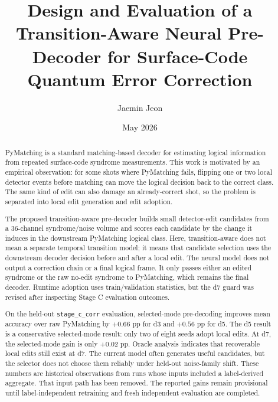 \documentclass[aps,prd,12pt,twocolumn,superscriptaddress,floatfix,longbibliography]{revtex4-2}
\begin{document}
\title{Design and Evaluation of a Transition-Aware Neural Pre-Decoder for Surface-Code Quantum Error Correction}
\author{Jaemin Jeon}
\date{May 2026}

\begin{abstract}
PyMatching is a standard matching-based decoder for estimating logical
information from repeated surface-code syndrome measurements. This work is
motivated by an empirical observation: for some shots where PyMatching fails,
flipping one or two local detector events before matching can move the logical
decision back to the correct class. The same kind of edit can also damage an
already-correct shot, so the problem is separated into local edit generation
and edit adoption.

The proposed transition-aware pre-decoder builds small detector-edit candidates
from a 36-channel syndrome/noise volume and scores each candidate by the change
it induces in the downstream PyMatching logical class. Here, transition-aware
does not mean a separate temporal transition model; it means that candidate
selection uses the downstream decoder decision before and after a local edit.
The neural model does not output a correction chain or a final logical frame.
It only passes either an edited syndrome or the raw no-edit syndrome to
PyMatching, which remains the final decoder. Runtime adoption uses
train/validation statistics, but the d7 guard was revised after inspecting
Stage C evaluation outcomes.

On the held-out \texttt{stage\_c\_corr} evaluation, selected-mode pre-decoding
improves mean accuracy over raw PyMatching by \(+0.66\) pp for d3 and
\(+0.56\) pp for d5. The d5 result is a conservative selected-mode result:
only two of eight seeds adopt local edits. At d7, the selected-mode gain is only
\(+0.02\) pp. Oracle analysis indicates that recoverable local edits still
exist at d7. The current model often generates useful candidates, but the
selector does not choose them reliably under held-out noise-family shift.
These numbers are historical observations from runs whose inputs included a
label-derived aggregate. That input path has been removed. The reported gains
remain provisional until label-independent retraining and fresh independent
evaluation are completed.
\end{abstract}

\maketitle
\end{document}
